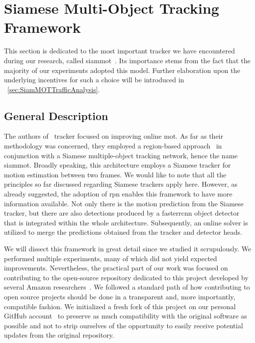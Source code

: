 \section{Siamese Multi-Object Tracking Framework}
\label{sec:SiamMOT}

This section is dedicated to the most important tracker we have encountered during our research, called \gls{siammot}~\cite{shuai2021siammot}. Its importance stems from the fact that the majority of our experiments adopted this model. Further elaboration upon the underlying incentives for such a choice will be introduced in \sectiontext{}~\ref{sec:SiamMOTTrafficAnalysis}.

\subsection{General Description}

The authors of~\cite{shuai2021siammot} tracker focused on improving online \gls{mot}. As far as their methodology was concerned, they employed a region-based approach~\cite{ren2017fasterrcnn} in conjunction with a Siamese multiple-object tracking network, hence the name \gls{siammot}. Broadly speaking, this architecture employs a Siamese tracker for motion estimation between two frames. We would like to note that all the principles so far discussed regarding Siamese trackers apply here. However, as already suggested, the adoption of \gls{rpn} enables this framework to have more information available. Not only there is the motion prediction from the Siamese tracker, but there are also detections produced by a \gls{fasterrcnn} object detector~\cite{ren2017fasterrcnn} that is integrated within the whole architecture. Subsequently, an online solver is utilized to merge the predictions obtained from the tracker and detector heads.

We will dissect this framework in great detail since we studied it scrupulously. We performed multiple experiments, many of which did not yield expected improvements. Nevertheless, the practical part of our work was focused on contributing to the open-source repository dedicated to this project developed by several Amazon researchers~\cite{websiammotoriggithub}. We followed a standard path of how contributing to open source projects should be done in a transparent and, more importantly, compatible fashion. We initialized a fresh fork of this project on our personal GitHub account~\cite{websiammotforkgithub} to preserve as much compatibility with the original software as possible and not to strip ourselves of the opportunity to easily receive potential updates from the original repository.

